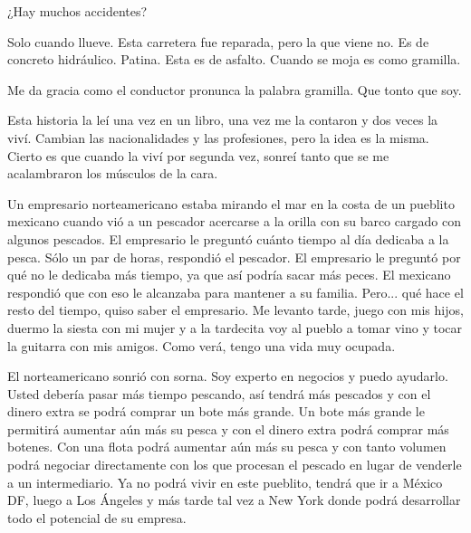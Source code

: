 \documentclass[12pt,twoside,openright,a5paper]{book}
\begin{document}
¿Hay muchos accidentes?

Solo cuando llueve. Esta carretera fue reparada, pero la que viene no. Es
de concreto hidráulico. Patina. Esta es de asfalto. Cuando se moja es
como gramilla.

Me da gracia como el conductor pronunca la palabra gramilla.
Que tonto que soy.


\vspace{0.5cm}
\hrulefill\hspace{0.2cm} \decofourleft\decofourright \hspace{0.2cm} \hrulefill
\vspace{0.5cm}

Esta historia la leí una vez en un libro, una vez me la contaron y dos
veces la viví. Cambian las nacionalidades y las profesiones, pero la idea
es la misma. Cierto es que cuando la viví por segunda vez, sonreí tanto
que se me acalambraron los músculos de la cara.

Un empresario norteamericano estaba mirando el mar en la costa de un
pueblito mexicano cuando vió a un pescador acercarse a la orilla con
su barco cargado con algunos pescados. El empresario le preguntó cuánto
tiempo al día dedicaba a la pesca. Sólo un par de horas, respondió el
pescador. El empresario le preguntó por qué no le dedicaba más tiempo,
ya que así podría sacar más peces. El mexicano respondió que con eso
le alcanzaba para mantener a su familia. Pero... qué hace el resto del
tiempo, quiso saber el empresario. Me levanto tarde, juego con mis hijos,
duermo la siesta con mi mujer y a la tardecita voy al pueblo a tomar vino
y tocar la guitarra con mis amigos. Como verá, tengo una vida muy ocupada.

El norteamericano sonrió con sorna. Soy experto en negocios y puedo
ayudarlo. Usted debería pasar más tiempo pescando, así tendrá más
pescados y con el dinero extra se podrá comprar un bote más grande. Un
bote más grande le permitirá aumentar aún más su pesca y con el dinero
extra podrá comprar más botenes. Con una flota podrá aumentar aún más su
pesca y con tanto volumen podrá negociar directamente con los que procesan
el pescado en lugar de venderle a un intermediario. Ya no podrá vivir en
este pueblito, tendrá que ir a México DF, luego a Los Ángeles y más tarde
tal vez a New York donde podrá desarrollar todo el potencial de su empresa.
\end{document}
